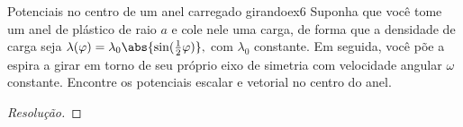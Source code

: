 \begin{exercício}{Potenciais no centro de um anel carregado girando}{ex6}
   Suponha que você tome um anel de plástico de raio \(a\) e cole nele uma carga, de forma que a densidade de carga seja \(\lambda(\varphi) = \lambda_0 \abs{\sin(\frac12 \varphi)},\) com \(\lambda_0\) constante. Em seguida, você põe a espira a girar em torno de seu próprio eixo de simetria com velocidade angular \(\omega\) constante. Encontre os potenciais escalar e vetorial no centro do anel.
\end{exercício}
\begin{proof}[Resolução]
    
\end{proof}
